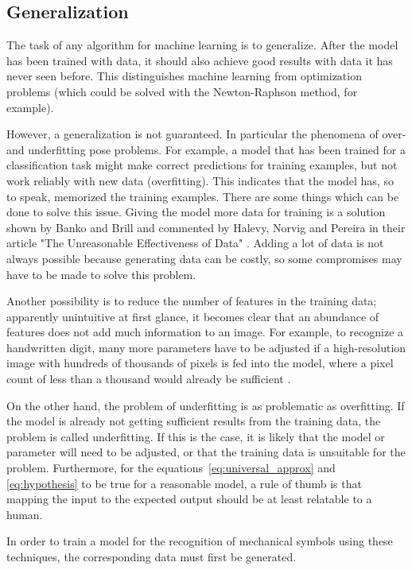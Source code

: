 \subsection{Generalization}

The task of any algorithm for machine learning is to generalize.
After the model has been trained with data, it should also achieve good results with data it has never seen before.
This distinguishes machine learning from optimization problems (which could be solved with the Newton-Raphson method, for example).

However, a generalization is not guaranteed. In particular the phenomena of over- and underfitting  pose problems.
For example, a model that has been trained for a classification task might make correct predictions for training examples, but not work reliably with new data (overfitting).
This indicates that the model has, so to speak, memorized the training examples.
There are some things which can be done to solve this issue.
Giving the model more data for training is a solution shown by Banko and Brill \cite {Banko2001} and commented by Halevy, Norvig and Pereira in their article "The Unreasonable Effectiveness of Data" \cite{Halevy2009}.
Adding a lot of data is not always possible because generating data can be costly, so some compromises may have to be made to solve this problem.

Another possibility is to reduce the number of features in the training data; apparently unintuitive at first glance, it becomes clear that an abundance of features does not add much information to an image. For example, to recognize a handwritten digit, many more parameters have to be adjusted if a high-resolution image with hundreds of thousands of pixels is fed into the model, where a pixel count of less than a thousand would already be sufficient \cite{Nielsen2015}.

On the other hand, the problem of underfitting is as problematic as overfitting.
If the model is already not getting sufficient results from the training data, the problem is called underfitting.
If this is the case, it is likely that the model or parameter will need to be adjusted, or that the training data is unsuitable for the problem.
Furthermore, for the equations~\eqref{eq:universal_approx} and \eqref{eq:hypothesis} to be true for a reasonable model, a rule of thumb is that mapping the input to the expected output should be at least relatable to a human.

In order to train a model for the recognition of mechanical symbols using these techniques, the corresponding data must first be generated.
